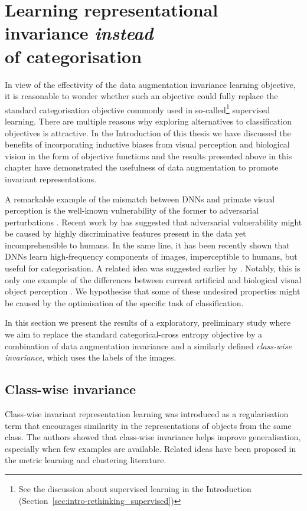 {\section[Learning representational invariance \textit{instead} of categorisation]{Learning representational invariance \textit{instead}\\of categorisation}
\label{sec:invariance-instead_categorisation}
In view of the effectivity of the data augmentation invariance learning objective, it is reasonable to wonder whether such an objective could fully replace the standard categorisation objective commonly used in so-called\footnote{See the discussion about supervised learning in the Introduction (Section~\ref{sec:intro-rethinking_supervised})} supervised learning. There are multiple reasons why exploring alternatives to classification objectives is attractive. In the Introduction of this thesis we have discussed the benefits of incorporating inductive biases from visual perception and biological vision in the form of objective functions and the results presented above in this chapter have demonstrated the usefulness of data augmentation to promote invariant representations. 

A remarkable example of the mismatch between DNNs and primate visual perception is the well-known vulnerability of the former to adversarial perturbations \citep{szegedy2013adversarial, dujmovic2020adversarial}. Recent work by \citet{ilyas2019advfeatures} has suggested that adversarial vulnerability might be caused by highly discriminative features present in the data yet incomprehensible to humans. In the same line, it has been recently shown \cite{wang2019highfreq} that DNNs learn high-frequency components of images, imperceptible to humans, but useful for categorisation. A related idea was suggested earlier by \citet{jo2017surfaceregularities}. Notably, this is only one example of the differences between current artificial and biological visual object perception \citep{sinz2019dlvsbrain, geirhos2020shortcutlearning, malhotra2020bioconstraints}. We hypothesise that some of these undesired properties might be caused by the optimisation of the specific task of classification. 

In this section we present the results of a exploratory, preliminary study where we aim to replace the standard categorical-cross entropy objective by a combination of data augmentation invariance and a similarly defined \textit{class-wise invariance}, which uses the labels of the images.

\subsection{Class-wise invariance}
\label{sec:invariance-classwise}
Class-wise invariant representation learning \citet{belharbi2017classinvariance} was introduced as a regularisation term that encourages similarity in the representations of objects from the same class. The authors showed that class-wise invariance helps improve generalisation, especially when few examples are available. Related ideas have been proposed in the metric learning and clustering literature.

}
